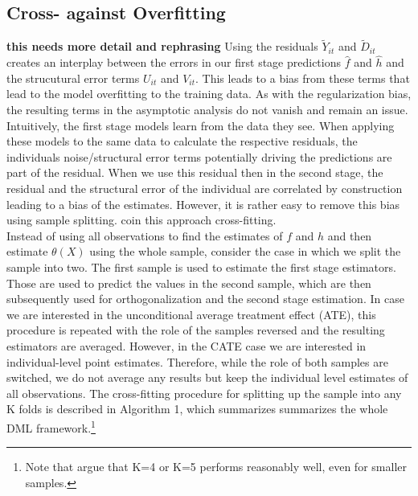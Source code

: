
\subsection{Cross- against Overfitting} \label{sec:cross-fitting}
\textbf{this needs more detail and rephrasing}
Using the residuals $\tilde{Y}_{it}$ and $\tilde{D}_{it}$ creates an interplay between the errors in our first stage predictions $\hat{f}$ and $\hat{h}$ and the strucutural error terms $U_{it}$ and $V_{it}$. This leads to a bias from these terms that lead to the model overfitting to the training data. As with the regularization bias, the resulting terms in the asymptotic analysis do not vanish and remain an issue. Intuitively, the first stage models learn from the data they see. When applying these models to the same data to calculate the respective residuals, the individuals noise/structural error terms potentially driving the predictions are part of the residual. When we use this residual then in the second stage, the residual and the structural error of the individual are correlated by construction leading to a bias of the estimates. 
However, it is rather easy to remove this bias using sample splitting. \cite{DML2017} coin this approach cross-fitting. \\ 
Instead of using all observations to find the estimates of $f$ and $h$ and then estimate $\theta(X)$ using the whole sample, consider the case in which we split the sample into two. The first sample is used to estimate the first stage estimators. Those are used to predict the values in the second sample, which are then subsequently used for orthogonalization and the second stage estimation. In case we are interested in the unconditional average treatment effect (ATE), this procedure is repeated with the role of the samples reversed and the resulting estimators are averaged. However, in the CATE case we are interested in individual-level point estimates. Therefore, while the role of both samples are switched, we do not average any results but keep the individual level estimates of all observations. The cross-fitting procedure for splitting up the sample into any K folds is described in Algorithm 1, which summarizes summarizes the whole DML framework.\footnote{Note that \cite{DML2017} argue that K=4 or K=5 performs reasonably well, even for smaller samples.} 

